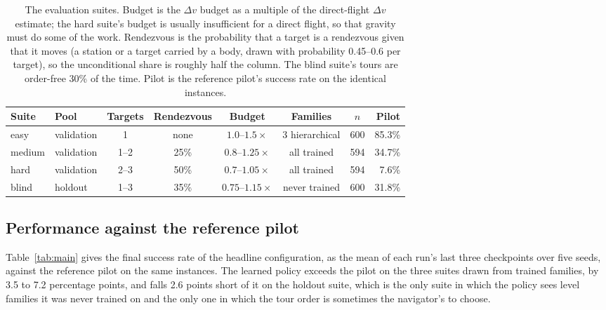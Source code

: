 \documentclass[11pt]{article}
\begin{document}
\begin{table}[t]
\centering
\small
\begin{tabular}{llcccccr}
\toprule
Suite & Pool & Targets & Rendezvous & Budget & Families & $n$ & Pilot \\
\midrule
easy   & validation & 1   & none      & $1.0$--$1.5\times$  & 3 hierarchical & 600 & 85.3\% \\
medium & validation & 1--2 & 25\%     & $0.8$--$1.25\times$ & all trained    & 594 & 34.7\% \\
hard   & validation & 2--3 & 50\%     & $0.7$--$1.05\times$ & all trained    & 594 & 7.6\% \\
blind  & holdout    & 1--3 & 35\%     & $0.75$--$1.15\times$ & never trained & 600 & 31.8\% \\
\bottomrule
\end{tabular}
\caption{The evaluation suites. Budget is the $\Delta v$ budget as a multiple of the
direct-flight $\Delta v$ estimate; the hard suite's budget is usually
insufficient for a direct flight, so that gravity must do some of the work.
Rendezvous is the probability that a target is a rendezvous given that it
moves (a station or a target carried by a body, drawn with probability
0.45--0.6 per target), so the unconditional share is roughly half the column.
The blind suite's tours are order-free 30\% of the time. Pilot is the
reference pilot's success rate on the identical instances.}
\label{tab:suites}
\end{table}

\subsection{Performance against the reference pilot}

Table~\ref{tab:main} gives the final success rate of the headline
configuration, as the mean of each run's last three checkpoints over five
seeds, against the reference pilot on the same instances. The learned policy
exceeds the pilot on the three suites drawn from trained families, by 3.5 to
7.2 percentage points, and falls 2.6 points short of it on the holdout
suite, which is the only suite in which the policy sees level families it
was never trained on and the only one in which the tour order is sometimes
the navigator's to choose.
\end{document}
